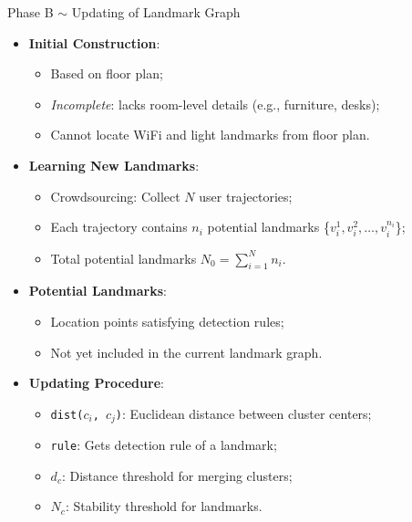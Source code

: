 \begin{frame}{Phase B $\sim$ Updating of Landmark Graph}
    \begin{itemize}
      \item \textbf{Initial Construction}:
        \begin{itemize}
            \item Based on floor plan;
            \item \textit{Incomplete}: lacks room-level details (e.g., furniture, desks);
            \item Cannot locate WiFi and light landmarks from floor plan.
        \end{itemize}
      \item \textbf{Learning New Landmarks}:
        \begin{itemize}
          \item Crowdsourcing: Collect $N$ user trajectories;
          \item Each trajectory contains $n_i$ potential landmarks \{$v_i^1, v_i^2, \dots, v_i^{n_i}$\};
          \item Total potential landmarks $N_0 = \sum_{i=1}^N n_i$.
        \end{itemize}
      \item \textbf{Potential Landmarks}:
        \begin{itemize}
          \item Location points satisfying detection rules;
          \item Not yet included in the current landmark graph.
        \end{itemize}
      \item \textbf{Updating Procedure}:
        \begin{itemize}
          \item \texttt{dist($c_i$, $c_j$)}: Euclidean distance between cluster centers;
          \item \texttt{rule}: Gets detection rule of a landmark;
          \item $d_c$: Distance threshold for merging clusters;
          \item $N_c$: Stability threshold for landmarks.
        \end{itemize}
    \end{itemize}
\end{frame}